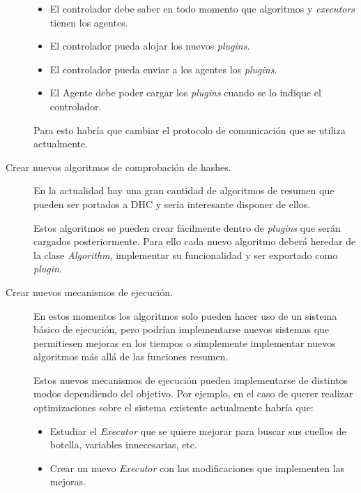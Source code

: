 \begin{description}
		\begin{itemize}
			\item El controlador debe saber en todo momento que algoritmos y \emph{executors} tienen los agentes.

			\item El controlador pueda alojar los nuevos \emph{plugins}.

			\item El controlador pueda enviar a los agentes los \emph{plugins}.

			\item El Agente debe poder cargar los \emph{plugins} cuando se lo indique el controlador.
		\end{itemize}

		Para esto habría que cambiar el protocolo de comunicación que se utiliza actualmente.

	\item[Crear nuevos algoritmos de comprobación de hashes.]

		En la actualidad hay una gran cantidad de algoritmos de resumen que pueden ser portados a  DHC y sería interesante disponer de ellos.

		Estos algoritmos se pueden crear fácilmente dentro de \emph{plugins} que serán cargados posteriormente. Para ello cada nuevo algoritmo deberá heredar de la clase \emph{Algorithm}, implementar su funcionalidad y ser exportado como \emph{plugin}.

	\item[Crear nuevos mecanismos de ejecución.]

		En estos momentos los algoritmos solo pueden hacer uso de un sistema básico de ejecución, pero podrían implementarse nuevos sistemas que permitiesen mejoras en los tiempos o simplemente implementar nuevos algoritmos más allá de las funciones resumen.

		Estos nuevos mecanismos de ejecución pueden implementarse de distintos modos dependiendo del objetivo. Por ejemplo, en el caso de querer realizar optimizaciones sobre el sistema existente actualmente habría que:

		\begin{itemize}
			\item Estudiar el \emph{Executor} que se quiere mejorar para buscar sus cuellos de botella, variables innecesarias, etc.

			\item Crear un nuevo \emph{Executor} con las modificaciones que implementen las mejoras.


\end{itemize}
\end{description}
